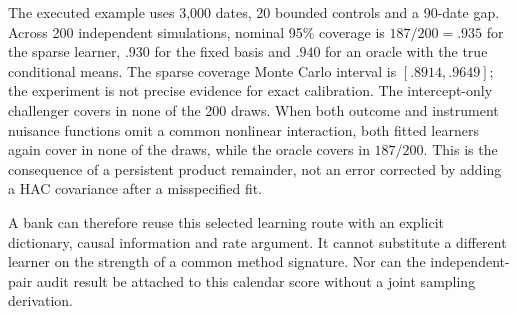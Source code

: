 The executed example uses 3,000 dates, 20 bounded controls and a 90-date gap.
Across 200 independent simulations, nominal 95\% coverage is $187/200=.935$
for the sparse learner, $.930$ for the fixed basis and $.940$ for an oracle
with the true conditional means. The sparse coverage Monte Carlo interval is
$[.8914,.9649]$; the experiment is not precise evidence for exact calibration.
The intercept-only challenger covers in none of the 200 draws. When both
outcome and instrument nuisance functions omit a common nonlinear interaction,
both fitted learners again cover in none of the draws, while the oracle covers
in $187/200$. This is the consequence of a persistent product remainder, not
an error corrected by adding a HAC covariance after a misspecified fit.

A bank can therefore reuse this selected learning route with an explicit
dictionary, causal information and rate argument. It cannot substitute a
different learner on the strength of a common method signature. Nor can the
independent-pair audit result be attached to this calendar score without a
joint sampling derivation.
